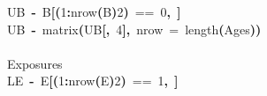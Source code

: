 \documentclass[a4paper]{article}
\newcommand{\hlnumber}[1]{\textcolor[rgb]{0.0823529411764706,0.0784313725490196,0.709803921568627}{#1}}%
\newcommand{\hlfunctioncall}[1]{\textcolor[rgb]{1,0,0}{#1}}%
\newcommand{\hlkeyword}[1]{\textcolor[rgb]{0,0,0}{\textbf{#1}}}%
\newcommand{\hlargument}[1]{\textcolor[rgb]{0.694117647058824,0.247058823529412,0.0196078431372549}{#1}}%
\newcommand{\hlcomment}[1]{\textcolor[rgb]{0.8,0.8,0.8}{#1}}%
\newcommand{\hlassignement}[1]{\textcolor[rgb]{0.215686274509804,0.215686274509804,0.384313725490196}{\textbf{#1}}}%
\newcommand{\hlsymbol}[1]{\textcolor[rgb]{0,0,0}{#1}}%
\newcommand{\hlprompt}[1]{\textcolor[rgb]{0,0,0}{#1}}%
\newcommand{\hlstd}[1]{\textcolor[rgb]{0,0,0}{#1}}%
\newenvironment{Houtput}{\raggedright}{%
%
}
\begin{document}
\begin{Houtput}
\hlstd{}\ttfamily\noindent
\hlprompt{\usebox{\hlnormalsizeboxgreaterthan}{\ }}\hlsymbol{UB}{\ }\hlassignement{\usebox{\hlnormalsizeboxlessthan}-}{\ }\hlsymbol{B}\hlkeyword{[}\hlkeyword{(}\hlnumber{1}\hlkeyword{:}\hlfunctioncall{nrow}\hlkeyword{(}\hlsymbol{B}\hlkeyword{)}\hlkeyword{\usebox{\hlnormalsizeboxpercent}\usebox{\hlnormalsizeboxpercent}}\hlnumber{2}\hlkeyword{)}{\ }=={\ }\hlnumber{0}\hlkeyword{,}{\ }\hlkeyword{]}\mbox{}
\normalfont
\hspace*{\fill}\\
\hlstd{}\ttfamily\noindent
\hlprompt{\usebox{\hlnormalsizeboxgreaterthan}{\ }}\hlsymbol{UB}{\ }\hlassignement{\usebox{\hlnormalsizeboxlessthan}-}{\ }\hlfunctioncall{matrix}\hlkeyword{(}\hlsymbol{UB}\hlkeyword{[}\hlkeyword{,}{\ }\hlnumber{4}\hlkeyword{]}\hlkeyword{,}{\ }\hlargument{nrow}{\ }\hlargument{=}{\ }\hlfunctioncall{length}\hlkeyword{(}\hlsymbol{Ages}\hlkeyword{)}\hlkeyword{)}\mbox{}
\normalfont
\hspace*{\fill}\\
\hlstd{}\ttfamily\noindent
\hlprompt{\usebox{\hlnormalsizeboxgreaterthan}{\ }}\hlcomment{\usebox{\hlnormalsizeboxhash}\usebox{\hlnormalsizeboxhash}\usebox{\hlnormalsizeboxhash}\usebox{\hlnormalsizeboxhash}\usebox{\hlnormalsizeboxhash}\usebox{\hlnormalsizeboxhash}\usebox{\hlnormalsizeboxhash}\usebox{\hlnormalsizeboxhash}\usebox{\hlnormalsizeboxhash}\usebox{\hlnormalsizeboxhash}\usebox{\hlnormalsizeboxhash}\usebox{\hlnormalsizeboxhash}\usebox{\hlnormalsizeboxhash}\usebox{\hlnormalsizeboxhash}\usebox{\hlnormalsizeboxhash}\usebox{\hlnormalsizeboxhash}\usebox{\hlnormalsizeboxhash}\usebox{\hlnormalsizeboxhash}\usebox{\hlnormalsizeboxhash}\usebox{\hlnormalsizeboxhash}\usebox{\hlnormalsizeboxhash}}\mbox{}
\normalfont
\hspace*{\fill}\\
\hlstd{}\ttfamily\noindent
\hlprompt{\usebox{\hlnormalsizeboxgreaterthan}{\ }}\hlcomment{\usebox{\hlnormalsizeboxhash}{\ }Exposures}\mbox{}
\normalfont
\hspace*{\fill}\\
\hlstd{}\ttfamily\noindent
\hlprompt{\usebox{\hlnormalsizeboxgreaterthan}{\ }}\hlsymbol{LE}{\ }\hlassignement{\usebox{\hlnormalsizeboxlessthan}-}{\ }\hlsymbol{E}\hlkeyword{[}\hlkeyword{(}\hlnumber{1}\hlkeyword{:}\hlfunctioncall{nrow}\hlkeyword{(}\hlsymbol{E}\hlkeyword{)}\hlkeyword{\usebox{\hlnormalsizeboxpercent}\usebox{\hlnormalsizeboxpercent}}\hlnumber{2}\hlkeyword{)}{\ }=={\ }\hlnumber{1}\hlkeyword{,}{\ }\hlkeyword{]}\mbox{}
\normalfont
\hspace*{\fill}\\

\end{Houtput}
\end{document}
